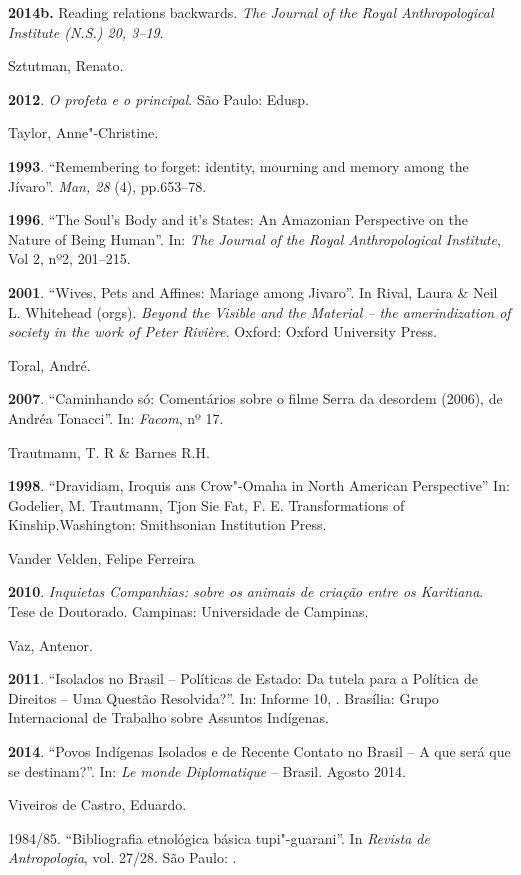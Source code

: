 \begin{Parskip}
\textbf{2014b.} Reading relations backwards. \emph{The Journal of the
Royal Anthropological Institute (N.S.) 20, 3--19}.

Sztutman, Renato.

\textbf{2012}. \emph{O profeta e o principal}. São Paulo: Edusp.

Taylor, Anne"-Christine.

\textbf{1993}. ``Remembering to forget: identity, mourning and memory
among the Jívaro''. \emph{Man, 28} (4), pp.653--78.

\textbf{1996}. ``The Soul's Body and it's States: An Amazonian
Perspective on the Nature of Being Human''. In: \emph{The} \emph{Journal}
\emph{of the Royal Anthropological Institute}, Vol 2, nº2, 201--215.

\textbf{2001}. ``Wives, Pets and Affines: Mariage among Jivaro''. In
Rival, Laura \& Neil L. Whitehead (orgs). \emph{Beyond the Visible and
the Material -- the amerindization of society in the work of Peter
Rivière.} Oxford: Oxford University Press.

Toral, André.

\textbf{2007}. ``Caminhando só: Comentários sobre o filme Serra da
desordem (2006), de Andréa Tonacci''. In: \emph{Facom}, nº 17.

Trautmann, T. R \& Barnes R.H.

\textbf{1998}. ``Dravidiam, Iroquis ans Crow"-Omaha in North American
Perspective'' In: Godelier, M. Trautmann, Tjon Sie Fat, F. E.
Transformations of Kinship.Washington: Smithsonian Institution Press.

Vander Velden, Felipe Ferreira

\textbf{2010}. \emph{Inquietas Companhias: sobre os animais de criação
entre os Karitiana}. Tese de Doutorado. Campinas: Universidade de
Campinas.

Vaz, Antenor.

\textbf{2011}. ``Isolados no Brasil -- Políticas de Estado: Da tutela
para a Política de Direitos -- Uma Questão Resolvida?''. In: Informe 10,
. Brasília: Grupo Internacional de Trabalho sobre Assuntos
Indígenas.

\textbf{2014}. ``Povos Indígenas Isolados e de Recente Contato no Brasil
-- A que será que se destinam?''. In: \emph{Le monde Diplomatique} --
Brasil. Agosto 2014.

Viveiros de Castro, Eduardo.

1984/85. ``Bibliografia etnológica básica tupi"-guarani''. In
\emph{Revista de Antropologia}, vol. 27/28. São Paulo: .


\end{Parskip}
